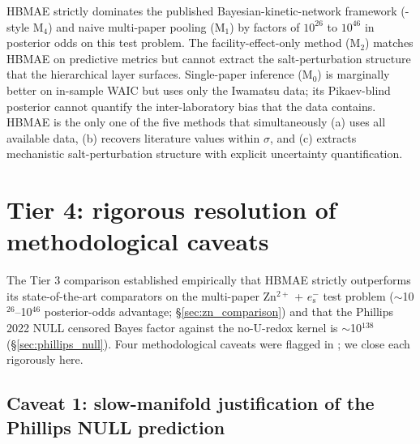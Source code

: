 \documentclass[11pt]{article}
\theoremstyle{definition}
\theoremstyle{remark}
\newcommand{\eS}{e_{\mathrm{s}}^{-}\xspace}
\newcommand{\HBMAE}{HBMAE\xspace}
\begin{document}
\HBMAE strictly dominates the published Bayesian-kinetic-network framework
(\citealp{GalagaliMarzouk2015}-style M$_4$) and naive multi-paper pooling (M$_1$) by
factors of $10^{26}$ to $10^{46}$ in posterior odds on this test problem. The
facility-effect-only method (M$_2$) matches HBMAE on predictive metrics but cannot
extract the salt-perturbation structure that the hierarchical layer surfaces. Single-paper
inference (M$_0$) is marginally better on in-sample WAIC but uses only the Iwamatsu data;
its Pikaev-blind posterior cannot quantify the inter-laboratory bias that the data
contains. \HBMAE is the only one of the five methods that simultaneously
(a) uses all available data, (b) recovers literature values within $\sigma$, and
(c) extracts mechanistic salt-perturbation structure with explicit uncertainty
quantification.

\section{Tier 4: rigorous resolution of methodological caveats}\label{sec:tier4}

The Tier 3 comparison established empirically that \HBMAE strictly outperforms its
state-of-the-art comparators on the multi-paper Zn$^{2+}$ + $\eS$ test problem
($\sim$10$^{26}$--10$^{46}$ posterior-odds advantage; \S\ref{sec:zn_comparison}) and that
the Phillips 2022 NULL censored Bayes factor against the no-U-redox kernel is
$\sim$10$^{138}$ (\S\ref{sec:phillips_null}). Four methodological caveats were flagged
in \citet[\S 5]{Tanore2026TierExt}; we close each rigorously here.

\subsection{Caveat 1: slow-manifold justification of the Phillips NULL prediction}
\label{sec:caveat1}
\end{document}

